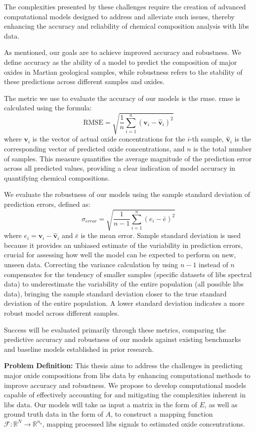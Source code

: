 The complexities presented by these challenges require the creation of advanced computational models designed to address and alleviate such issues, thereby enhancing the accuracy and reliability of chemical composition analysis with \gls{libs} data.

As mentioned, our goals are to achieve improved accuracy and robustness.
We define accuracy as the ability of a model to predict the composition of major oxides in Martian geological samples, while robustness refers to the stability of these predictions across different samples and oxides.

The metric we use to evaluate the accuracy of our models is the \gls{rmse}. \gls{rmse} is calculated using the formula:
\[
\text{RMSE} = \sqrt{\frac{1}{n} \sum_{i=1}^{n} (\mathbf{v}_i - \hat{\mathbf{v}}_i)^2}
\]
where \( \mathbf{v}_i \) is the vector of actual oxide concentrations for the \( i \)-th sample, \( \hat{\mathbf{v}}_i \) is the corresponding vector of predicted oxide concentrations, and \( n \) is the total number of samples. This measure quantifies the average magnitude of the prediction error across all predicted values, providing a clear indication of model accuracy in quantifying chemical compositions.

We evaluate the robustness of our models using the sample standard deviation of prediction errors, defined as:
\[
\sigma_{error} = \sqrt{\frac{1}{n-1} \sum_{i=1}^{n} (e_i - \bar{e})^2}
\]
where \( e_i = \mathbf{v}_i - \hat{\mathbf{v}}_i \) and \( \bar{e} \) is the mean error.
Sample standard deviation is used because it provides an unbiased estimate of the variability in prediction errors, crucial for assessing how well the model can be expected to perform on new, unseen data.
Correcting the variance calculation by using \( n-1 \) instead of \( n \) compensates for the tendency of smaller samples (specific datasets of \gls{libs} spectral data) to underestimate the variability of the entire population (all possible \gls{libs} data), bringing the sample standard deviation closer to the true standard deviation of the entire population.
A lower standard deviation indicates a more robust model across different samples.

Success will be evaluated primarily through these metrics, comparing the predictive accuracy and robustness of our models against existing benchmarks and baseline models established in prior research.

\textbf{Problem Definition:} This thesis aims to address the challenges in predicting major oxide compositions from \gls{libs} data by enhancing computational methods to improve accuracy and robustness. We propose to develop computational models capable of effectively accounting for and mitigating the complexities inherent in \gls{libs} data. Our models will take as input a matrix in the form of $E$, as well as ground truth data in the form of $A$, to construct a mapping function $\mathcal{F}: \mathbb{R}^N \rightarrow \mathbb{R}^{n_{o}}$, mapping processed \gls{libs} signals to estimated oxide concentrations.

